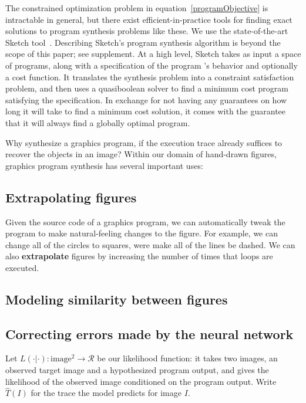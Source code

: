 \documentclass{article}
\begin{document}
The constrained optimization problem in
equation~\ref{programObjective} is intractable in general, but there
exist efficient-in-practice tools for finding exact solutions to
program synthesis problems like these. We use the state-of-the-art Sketch
tool~\cite{solar2008program}. Describing Sketch's program synthesis
algorithm is beyond the scope of this paper; see supplement.  At a
high level, Sketch takes as input a space of programs, along with a
specification of the program 's behavior and optionally a cost
function.  It translates the synthesis problem into a constraint
satisfaction problem, and then uses a quasiboolean solver to find a
minimum cost program satisfying the specification.  In exchange for
not having any guarantees on how long it will take to find a minimum
cost solution, it comes with the guarantee that it will always find a
globally optimal program.

Why synthesize a graphics program,
if the execution trace already suffices to recover the objects in an image?
Within our domain of hand-drawn figures, graphics program synthesis has several important uses:
\subsection{Extrapolating figures}
Given the source code of a graphics program,
we can automatically tweak the program
to make natural-feeling changes to the figure.
For example,
we can change all of the circles to squares,
were make all of the lines be dashed.
We can also \textbf{extrapolate} figures
by increasing the number of times that loops are executed.


\subsection{Modeling similarity between figures}



\subsection{Correcting errors made by the neural network}

Let $L(\cdot | \cdot):\text{image}^2\to \mathcal{R}$ be our likelihood
function: it takes two images, an observed target image and a
hypothesized program output, and gives the likelihood of the observed
image conditioned on the program output.
Write $\hat{T}(I)$ for the trace the model predicts for image $I$.
\end{document}
